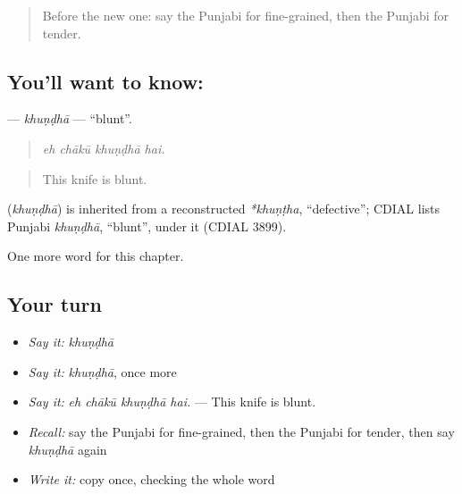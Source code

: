 \label{lesson:PA-C297-khundha}



\begin{quote}
Before the new one: say the Punjabi for fine-grained, then the Punjabi for tender.
\end{quote}

\subsection*{You'll want to know: }
\textbf{} — \emph{khuṇḍhā} — \textquotedblleft{}blunt\textquotedblright{}.

\begin{quote}
   
\end{quote}

\begin{quote}
\emph{eh chākū khuṇḍhā hai.}
\end{quote}

\begin{quote}
This knife is blunt.
\end{quote}

\begin{cousinweb}
\textbf{} (\emph{khuṇḍhā}) is inherited from a reconstructed \emph{*khuṇṭha}, \textquotedblleft{}defective\textquotedblright{}; CDIAL lists Punjabi \emph{khuṇḍhā}, \textquotedblleft{}blunt\textquotedblright{}, under it (CDIAL 3899).
\end{cousinweb}

\begin{grammarlens}[title={What you've built}]
One more word for this chapter.
\end{grammarlens}

\subsection*{Your turn}
\begin{itemize}
\raggedright
  \item \emph{Say it:} \emph{khuṇḍhā}
  \item \emph{Say it:} \emph{khuṇḍhā}, once more
  \item \emph{Say it:} \emph{eh chākū khuṇḍhā hai.} — This knife is blunt.
  \item \emph{Recall:} say the Punjabi for fine-grained, then the Punjabi for tender, then say \emph{khuṇḍhā} again
  \item \emph{Write it:} copy \textbf{} once, checking the whole word
\end{itemize}

